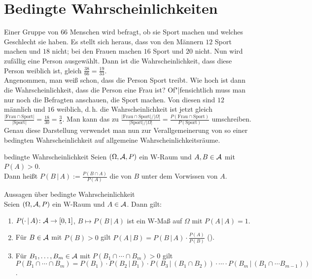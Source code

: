 \section{%
    Bedingte Wahrscheinlichkeiten%
}

\begin{Bsp}
    Einer Gruppe von $66$ Menschen wird befragt, ob sie Sport machen und
    welches Geschlecht sie haben.
    Es stellt sich heraus, dass von den Männern $12$ Sport machen und $18$ nicht;
    bei den Frauen machen $16$ Sport und $20$ nicht.
    Nun wird zufällig eine Person ausgewählt.
    Dann ist die Wahrscheinlichkeit, dass diese Person weiblich ist, gleich
    $\frac{38}{66} = \frac{19}{33}$.\\
    Angenommen, man weiß schon, dass die Person Sport treibt.
    Wie hoch ist dann die Wahrscheinlichkeit, dass die Person eine Frau ist?
    Of"|fensichtlich muss man nur noch die Befragten anschauen, die Sport machen.
    Von diesen sind $12$ männlich und $16$ weiblich, d.\,h. die Wahrscheinlichkeit ist jetzt
    gleich $\frac{|\text{Frau} \cap \text{Sport}|}{|\text{Sport}|} = \frac{18}{30} = \frac{3}{5}$.
    Man kann das zu $\frac{|\text{Frau} \cap \text{Sport}|/|\Omega|}{|\text{Sport}|/|\Omega|} =
    \frac{P(\text{Frau} \cap \text{Sport})}{P(\text{Sport})}$ umschreiben.
    Genau diese Darstellung verwendet man nun zur Verallgemeinerung von so einer
    bedingten Wahrscheinlichkeit auf allgemeine Wahrscheinlichkeitsräume.
\end{Bsp}

\linie

\begin{Def}{bedingte Wahrscheinlichkeit}
    Seien $(\Omega, \mathcal{A}, P)$ ein W-Raum und $A, B \in \mathcal{A}$ mit $P(A) > 0$.\\
    Dann heißt $P(B \,|\, A) := \frac{P(B \cap A)}{P(A)}$ die 
    von $B$ unter dem Vorwissen von $A$.
\end{Def}

\begin{Satz}{Aussagen über bedingte Wahrscheinlichkeit}\\
    Seien $(\Omega, \mathcal{A}, P)$ ein W-Raum und $A \in \mathcal{A}$.
    Dann gilt:
    \begin{enumerate}
        \item
        $P(\cdot \,|\, A)\colon \mathcal{A} \rightarrow [0, 1]$, $B \mapsto P(B \,|\, A)$ ist ein W-Maß
        auf $\Omega$ mit $P(A \,|\, A) = 1$.

        \item
        Für $B \in \mathcal{A}$ mit $P(B) > 0$ gilt
        $P(A \,|\, B) = P(B \,|\, A) \cdot \frac{P(A)}{P(B)}$
        ().

        \item
        Für $B_1, \dotsc, B_m \in \mathcal{A}$ mit $P(B_1 \cap \dotsb \cap B_m) > 0$ gilt\\
        $P(B_1 \cap \dotsb \cap B_m) = P(B_1) \cdot P(B_2 \,|\, B_1) \cdot
        P(B_3 \,|\, (B_1 \cap B_2)) \cdot \dotsm \cdot
        P(B_m \,|\, (B_1 \cap \dotsb B_{m-1}))$.
    \end{enumerate}
\end{Satz}

